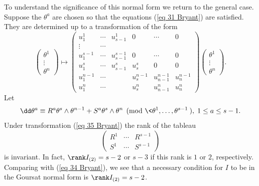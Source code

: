 To understand the significance of this normal form we return to the general case. Suppose the $\theta^a$ are chosen so that the equations (\ref{eq 31 Bryant}) are satisfied. They are determined up to a transformation of the form
\[
\begin{pmatrix}
    \theta^1 \\
    \vdots \\
    \theta^n
\end{pmatrix}\mapsto 
\begin{pmatrix}
    u^1_1 & \cdots & u^1_{s-1} & 0 & \cdots & 0\\
    \vdots & \cdots & & &\\
    u^{s-1}_1 & \cdots & u^{s-1}_{s-1} & 0 & \cdots & 0\\
    u^s_1 & \cdots & u^s_{s-1} & u^s_s & 0 & 0\\
    u^{n-1}_1 & \cdots & & u^{n-1}_s & u^{n-1}_{n-1}& u^{n-1}_n\\
    u^n_1 & \cdots & & u^n_s & u^n_{n-1} & u^n_n
\end{pmatrix}
\begin{pmatrix}
    \theta^1 \\
    \vdots \\
    \theta^n
\end{pmatrix}.\label{eq 35 Bryant}
\]
Let 
\[\dd\theta^a\equiv R^a \theta^s\wedge\theta^{n-1}+S^a \theta^s\wedge\theta^n \pmod{\<\theta^1,\ldots,\theta^{s-1}\>},\;1\leq a\leq s-1.\]
Under transformation (\ref{eq 35 Bryant}) the rank of the tableau 
\[\begin{pmatrix}
    R^1 & \cdots & R^{s-1}\\
    S^1 & \cdots & S^{s-1}
\end{pmatrix}\label{eq 36 Bryant}
\]
is invariant. In fact, $\rank I_{(2)}=s-2$ or $s-3$ if this rank is $1$ or $2$, respectively. Comparing with (\ref{eq 34 Bryant}), we see that a necessary condition for $I$ to be in the Goursat normal form is $\rank I_{(2)}=s-2$.


